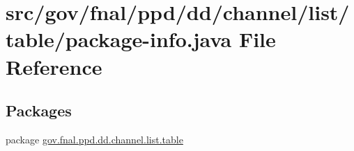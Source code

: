 \hypertarget{dd_2channel_2list_2table_2package-info_8java}{\section{src/gov/fnal/ppd/dd/channel/list/table/package-\/info.java File Reference}
\label{dd_2channel_2list_2table_2package-info_8java}
}
\subsection*{Packages}
\begin{DoxyCompactItemize}
\item 
package \hyperlink{namespacegov_1_1fnal_1_1ppd_1_1dd_1_1channel_1_1list_1_1table}{gov.\-fnal.\-ppd.\-dd.\-channel.\-list.\-table}
\end{DoxyCompactItemize}

